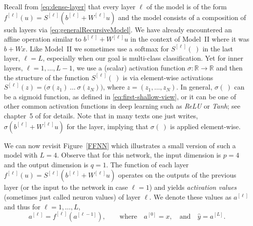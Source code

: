 \documentclass[12pt]{article}
\begin{document}
Recall from  \eqref{eq:dense-layer} that every layer $\ell$ of the model is of the form $f^{[\ell]}(u) = S^{[\ell]}(b^{[\ell]} + W^{[\ell]} u)$ and the model consists of a composition of such layers via \eqref{eq:generalRecursiveModel}. We have already encountered an affine operation similar to $b^{[\ell]} + W^{[\ell]} u$ in the context of Model~II where it was $b + Wx$. Like Model~II we sometimes use a softmax for $S^{[\ell]}(~)$ in the last layer, $\ell=L$, especially when our goal is multi-class classification. Yet for inner layers, $\ell = 1,\ldots,L-1$, we use a (scalar) activation function $\sigma: \mathbb R \to \mathbb R$ and then the structure of the function $S^{[\ell]}(~)$ is via element-wise activations $S^{[\ell]}(z) = \big(\sigma\left(z_{1}\right) ~ \ldots ~\sigma\left(z_{N}\right)\big)$, where $z = (z_1, \ldots, z_N)$. In general, $\sigma(~)$ can be a sigmoid function, as defined in \eqref{eq:first-shallow-view}, or it can be one of other common activation functions in deep learning such as {\em ReLU} or {\em Tanh}; see chapter~5 of \cite{LiquetMokaNazarathy2024DeepLearning} for details. Note that in many texts one just writes, $\sigma(b^{[\ell]} + W^{[\ell]} u)$ for the layer, implying that $\sigma(~)$ is applied element-wise.

We can now revisit Figure~\ref{FFNN} which illustrates a small version of such a model with $L=4$. Observe that for this network,  the input dimension is $p=4$ and the output dimension is $q=1$. The function of each layer $f^{[\ell]}(u) = S^{[\ell]}(b^{[\ell]} + W^{[\ell]} u)$ operates on the outputs of the previous layer (or the input to the network in case $\ell=1$) and yields {\em activation values} (sometimes just called neuron values) of layer $\ell$. We denote these values as $a^{[\ell]}$ and thus for $\ell=1,\ldots,L$,
%
\begin{equation}
\label{eq:s-deep-step}
a^{[\ell]} = f^{[\ell]}(a^{[\ell-1]}),
\qquad
\textrm{where}
\quad
a^{[0]} = x,
\quad
\text{and}
\quad
\hat{y} = a^{[L]}.
\end{equation}
%
\end{document}
